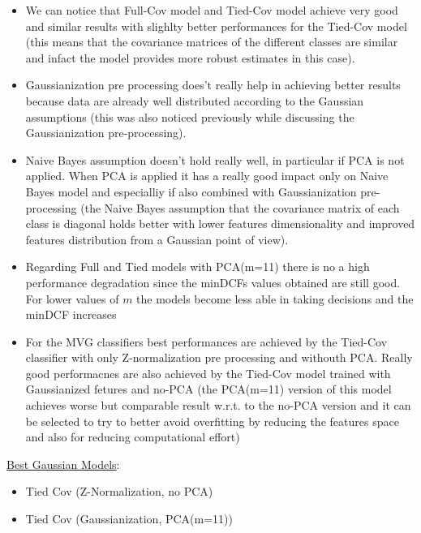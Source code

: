 \documentclass[10pt, a4paper, twocolumn]{article} %
\begin{document}
\begin{itemize}
	\item We can notice that Full-Cov model and Tied-Cov model achieve very good and similar results with
		  slighlty better performances for the Tied-Cov model (this means that the covariance matrices
		  of the different classes are similar and infact the model provides more robust estimates
		  in this case).
	\item Gaussianization pre processing does't really help in achieving better results because 
	      data are already well distributed according to the Gaussian assumptions (this was also noticed
		  previously while discussing the Gaussianization pre-processing).
	\item Naive Bayes assumption doesn't hold really well, in particular if PCA is not applied. When 
		  PCA is applied it has a really good impact only on Naive Bayes model and especialliy if also
		  combined with Gaussianization pre-processing (the Naive Bayes assumption that the covariance
		  matrix of each class is diagonal holds better with lower features dimensionality and improved
		  features distribution from a Gaussian point of view).
	\item Regarding Full and Tied models with PCA(m=11) there is no a high performance degradation
		  since the minDCFs values obtained are still good. For lower values of $m$ the models become less
		  able in taking decisions and the minDCF increases
	\item For the MVG classifiers best performances are achieved by the Tied-Cov classifier with
		  only Z-normalization pre processing and withouth PCA. Really good performacnes are also
		  achieved by the Tied-Cov model trained with Gaussianized
		  fetures and no-PCA (the PCA(m=11) version of this model achieves worse but comparable result w.r.t. to the no-PCA version
		  and it can be selected to try to better avoid overfitting by reducing the features 
		  space and also for reducing computational effort)
\end{itemize}
\underline{Best Gaussian Models}: 
\begin{itemize}
	\item Tied Cov (Z-Normalization, no PCA)
	\item Tied Cov (Gaussianization, PCA(m=11))
\end{itemize}
\end{document}
